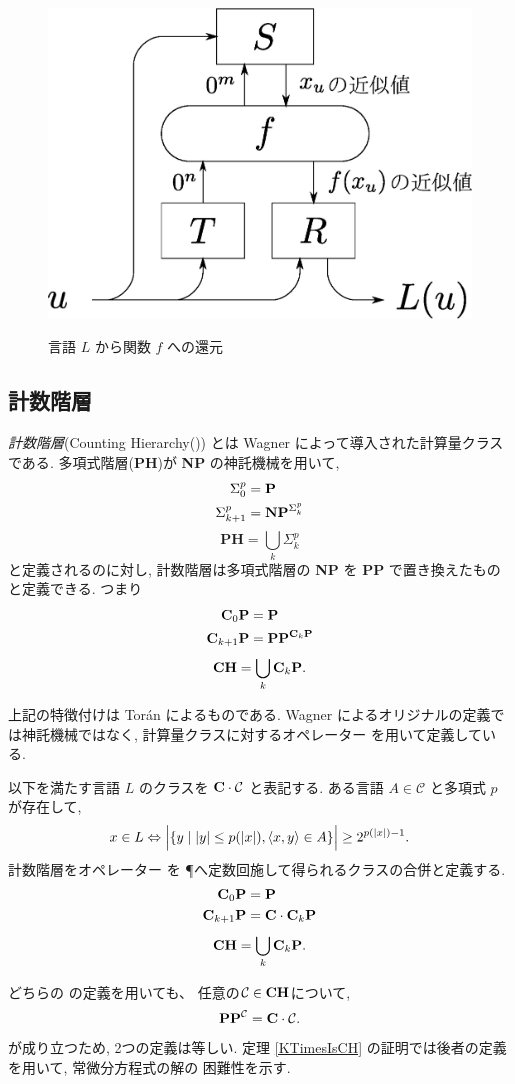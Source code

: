  \begin{figure}
  \begin{center}
  \label{fig:reduction}
  \includegraphics[scale=0.25]{image/reduction.eps}
  \caption{言語 $L$ から関数 $f$ への還元}
  \end{center}
 \end{figure}



\subsection{計数階層}

\emph{計数階層}(Counting Hierarchy(\CH)) とは
Wagner によって導入された計算量クラスである\cite{wagner1986complexity}.
多項式階層({\bf PH})が {\bf NP} の神託機械を用いて,
\begin{align*}
 \Sigma^p_0 
 &= \P \\
 \Sigma^p_{k+1}
 &= \mathbf{NP}^{\Sigma^p_k}
\end{align*}
\[
 \mathbf{PH} = \bigcup_k \Sigma^p_k
\]
と定義されるのに対し,
計数階層は多項式階層の {\bf NP} を {\bf PP} で置き換えたものと定義できる. つまり
\begin{align*}
 \C_0 \P  
 &= \P \\
 \C_{k+1} \P
 &= \PP^{\C_k \P}
\end{align*}
\[
 \CH = \bigcup_k \C_k \P.
\]

上記の特徴付けは Tor{\'a}n によるものである\cite{toran1991complexity}.
Wagner によるオリジナルの定義では神託機械ではなく,
計算量クラスに対するオペレーター \C を用いて定義している.

以下を満たす言語 $L$ のクラスを $\C \cdot \mathcal C$ と表記する.
ある言語 $A \in \mathcal C$ と多項式 $p$ が存在して,
\[
x \in L \Leftrightarrow
 \Bigl| \{y \mid |y| \le p(|x|), \langle x, y \rangle \in A \}\Bigr|
 \ge 2^{p(|x|)-1}.
\]
計数階層をオペレーター \C を \P へ定数回施して得られるクラスの合併と定義する.
\begin{align*}
 \C_0 \P
 &= \P \\
 \C_{k+1} \P
 &= \C \cdot \C_k \P
\end{align*}
\[
 \CH = \bigcup_k \C_k \P.
\]

どちらの \CH の定義を用いても、 任意の$\mathcal C \in \CH$について,
\[
 \PP^\mathcal C = \C \cdot \mathcal C.
\]
が成り立つため, 2つの定義は等しい.
定理 \ref{KTimesIsCH} の証明では後者の定義を用いて, 
常微分方程式の解の \CH 困難性を示す.

